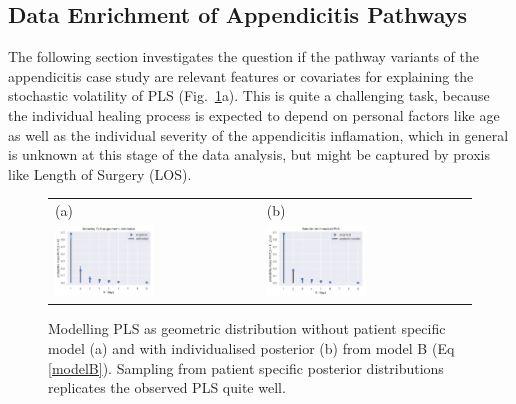 %

\subsection{Data Enrichment of Appendicitis Pathways}
\label{sec:ML}
The following section investigates the question if the pathway
variants of the appendicitis case study are relevant features or
covariates for explaining the stochastic volatility of PLS (Fig.~\ref{fig:Geom}a).
This is quite a challenging task, because the individual healing process is expected to depend on personal factors like age \cite{polanczyk2001impact} as well as the individual severity of the appendicitis inflamation, which in general is unknown at this stage of the data analysis, but might be captured by proxis like Length of Surgery (LOS).

\begin{figure}
  \centering
  \begin{tabular}{ll}
    (a) & (b) \\
    \includegraphics[width=0.5\textwidth]{images/DS19eH1_G0__empirical_geometric.pdf}
    &
    \includegraphics[width=0.5\textwidth]{images/DS19fk1_c0__sampled_posterior.pdf}\\
  \end{tabular}
    \caption{Modelling PLS as geometric distribution without patient
      specific model (a) and with individualised posterior (b) from
      model B (Eq \eqref{modelB}). Sampling from patient specific
      posterior distributions replicates the observed PLS quite well.
      }
    \label{fig:Geom}
\end{figure}

